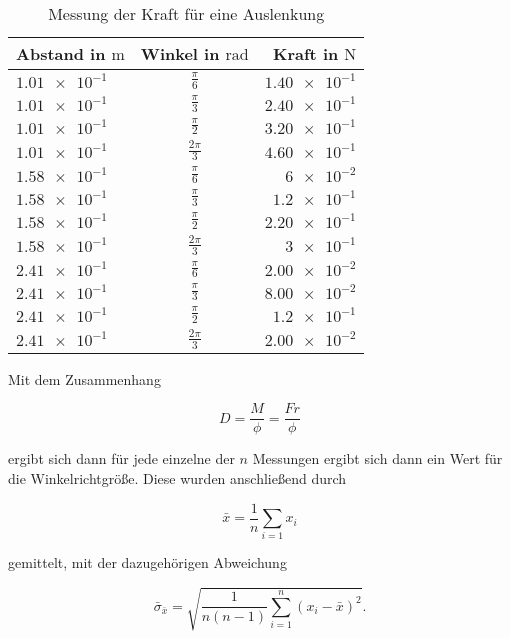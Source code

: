 \begin{table}
\centering
\caption{Messung der Kraft für eine Auslenkung}
\label{tab: winkelricht}
\renewcommand{\arraystretch}{1.2}
\begin{tabular}{lcr}
	\toprule
	Abstand in $\si{\meter}$ & Winkel in $\mathrm{rad}$ & Kraft in $\si{\newton}$ \\
	\midrule
	$\num{1.01e-1}$ & $\frac{\pi}{6}$ & $\num{1.40e-1}$ \\
	$\num{1.01e-1}$ & $\frac{\pi}{3}$ & $\num{2.40e-1}$ \\
	$\num{1.01e-1}$ & $\frac{\pi}{2}$ & $\num{3.20e-1}$ \\
	$\num{1.01e-1}$ & $\frac{2\pi}{3}$ & $\num{4.60e-1}$ \\
	$\num{1.58e-1}$ & $\frac{\pi}{6}$ & $\num{6e-2}$ \\
	$\num{1.58e-1}$ & $\frac{\pi}{3}$ & $\num{1.2e-1}$ \\
	$\num{1.58e-1}$ & $\frac{\pi}{2}$ & $\num{2.20e-1}$ \\
	$\num{1.58e-1}$ & $\frac{2\pi}{3}$ & $\num{3e-1}$ \\
	$\num{2.41e-1}$ & $\frac{\pi}{6}$ & $\num{2.00e-2}$ \\
	$\num{2.41e-1}$ & $\frac{\pi}{3}$ & $\num{8.00e-2}$ \\
	$\num{2.41e-1}$ & $\frac{\pi}{2}$ & $\num{1.2e-1}$ \\
	$\num{2.41e-1}$ & $\frac{2\pi}{3}$ & $\num{2.00e-2}$ \\
	\bottomrule
\end{tabular}
\end{table}

Mit dem Zusammenhang

\begin{equation*}
D=\frac{M}{\phi}=\frac{Fr}{\phi}
\end{equation*}

ergibt sich dann für jede einzelne der $n$ Messungen ergibt sich dann ein Wert für die Winkelrichtgröße.
Diese wurden anschließend durch

\begin{equation}
\label{eq:mittel}
\bar{x}=\frac{1}{n}\sum_{i=1}x_i
\end{equation}

gemittelt, mit der dazugehörigen Abweichung

\begin{equation}
\label{eq:stand_ab}
\bar{\sigma}_{\bar{x}}=\sqrt{\frac{1}{n(n-1)}\sum_{i=1}^{n}(x_i-\bar{x})^2}.
\end{equation}

